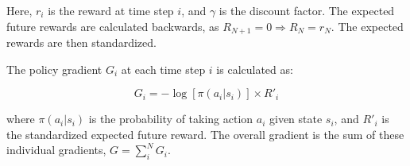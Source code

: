 \documentclass{article}
\renewenvironment{leftbar}[1][\hsize]{
    \def\FrameCommand{{\color{barcolor}\vrule width 0.5pt \hspace{10pt}}}
    \MakeFramed{\hsize#1 \advance\hsize-\width \FrameRestore}
}{\endMakeFramed}
\begin{document}
\begin{leftbar}
    Here, $r_i$ is the reward at time step $i$, and $\gamma$ is the discount factor. The expected future rewards are calculated backwards, as $R_{N+1} = 0 \Rightarrow R_N = r_N$. The expected rewards are then standardized.

    The policy gradient $G_i$ at each time step $i$ is calculated as:

    \begin{equation}
        G_i = - \log \left[ \pi(a_i|s_i) \right] \times R'_i
    \end{equation}

    where $\pi(a_i|s_i)$ is the probability of taking action $a_i$ given state $s_i$, and $R'_i$ is the standardized expected future reward. The overall gradient is the sum of these individual gradients, $G = \sum_{i}^N G_i$.

\end{leftbar}
\end{document}
